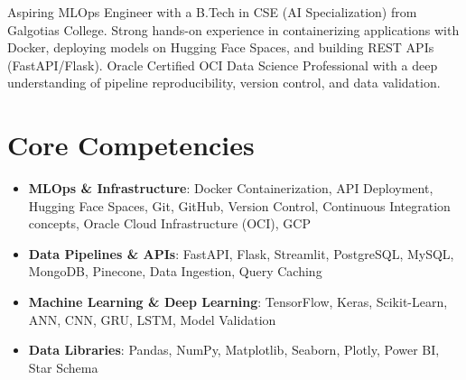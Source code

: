 \documentclass[11pt,a4paper,sans]{moderncv}
\begin{document}
\makecvtitle

\vspace{6pt}
\small{Aspiring MLOps Engineer with a B.Tech in CSE (AI Specialization) from Galgotias College. Strong hands-on experience in containerizing applications with Docker, deploying models on Hugging Face Spaces, and building REST APIs (FastAPI/Flask). Oracle Certified OCI Data Science Professional with a deep understanding of pipeline reproducibility, version control, and data validation.}

\section{Core Competencies}
\vspace{1pt}
\begin{itemize}
\item \textbf{MLOps \& Infrastructure}: Docker Containerization, API Deployment, Hugging Face Spaces, Git, GitHub, Version Control, Continuous Integration concepts, Oracle Cloud Infrastructure (OCI), GCP
\item \textbf{Data Pipelines \& APIs}: FastAPI, Flask, Streamlit, PostgreSQL, MySQL, MongoDB, Pinecone, Data Ingestion, Query Caching
\item \textbf{Machine Learning \& Deep Learning}: TensorFlow, Keras, Scikit-Learn, ANN, CNN, GRU, LSTM, Model Validation
\item \textbf{Data Libraries}: Pandas, NumPy, Matplotlib, Seaborn, Plotly, Power BI, Star Schema
\end{itemize}
\end{document}
